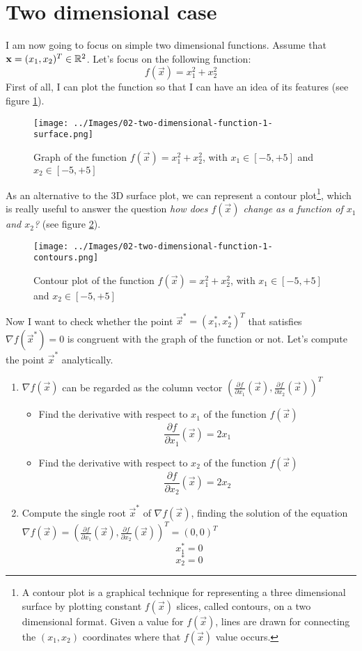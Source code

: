 \section{Two dimensional case}
    I am now going to focus on simple two dimensional functions. Assume that \(\mathbf{x} = (x_1, x_2)^T \in \mathbb{R}^2\). Let's focus on the following function:
    \[f(\vec{x}) = x_{1}^{2} + x_{2}^{2}\]
    First of all, I can plot the function so that I can have an idea of its features (see figure \ref{two-dimensional-function-1-surface}).
    \begin{figure}
        \centering
        \texttt{[image: ../Images/02-two-dimensional-function-1-surface.png]}
        \caption{Graph of the function \(f(\vec{x}) = x_{1}^{2} + x_{2}^{2}\), with \(x_1 \in [-5, +5]\) and \(x_2 \in [-5, +5]\)}
        \label{two-dimensional-function-1-surface}
    \end{figure}
    As an alternative to the 3D surface plot, we can represent a contour plot\footnote{A contour plot is a graphical technique for representing a three dimensional surface by plotting constant \(f(\vec{x})\) slices, called contours, on a two dimensional format. Given a value for \(f(\vec{x})\), lines are drawn for connecting the \((x_1, x_2)\) coordinates where that \(f(\vec{x})\) value occurs.}, which is really useful to answer the question \emph{how does \(f(\vec{x})\) change as a function of \(x_1\) and \(x_2\)?} (see figure \ref{two-dimensional-function-1-contours}).\par
    \begin{figure}
        \centering
        \texttt{[image: ../Images/02-two-dimensional-function-1-contours.png]}
        \caption{Contour plot of the function \(f(\vec{x}) = x_{1}^{2} + x_{2}^{2}\), with \(x_1 \in [-5, +5]\) and \(x_2 \in [-5, +5]\)}
        \label{two-dimensional-function-1-contours}
    \end{figure}
    Now I want to check whether the point \(\vec{x}^* = (x_{1}^{*}, x_{2}^{*})^T\) that satisfies \(\nabla f(\vec{x}^*) = 0\) is congruent with the graph of the function or not. Let's compute the point \(\vec{x}^*\) analytically.
    \begin{enumerate}
        \item \(\nabla f(\vec{x})\) can be regarded as the column vector \((\frac{\partial f}{\partial x_1}(\vec{x}), \frac{\partial f}{\partial x_2}(\vec{x}))^T\)
        \begin{itemize}
            \item Find the derivative with respect to \(x_1\) of the function \(f(\vec{x})\)
            \[\frac{\partial f}{\partial x_1}(\vec{x}) = 2x_1\]
            \item Find the derivative with respect to \(x_2\) of the function \(f(\vec{x})\)
            \[\frac{\partial f}{\partial x_2}(\vec{x}) = 2x_2\]
        \end{itemize}
        \item Compute the single root \(\vec{x}^{*}\) of \(\nabla f(\vec{x})\), finding the solution of the equation \(\nabla f(\vec{x}) = (\frac{\partial f}{\partial x_1}(\vec{x}), \frac{\partial f}{\partial x_2}(\vec{x}))^T = (0, 0)^T\)
        \[x^{*}_{1} = 0\]
        \[x^{*}_{2} = 0\]
    \end{enumerate}
